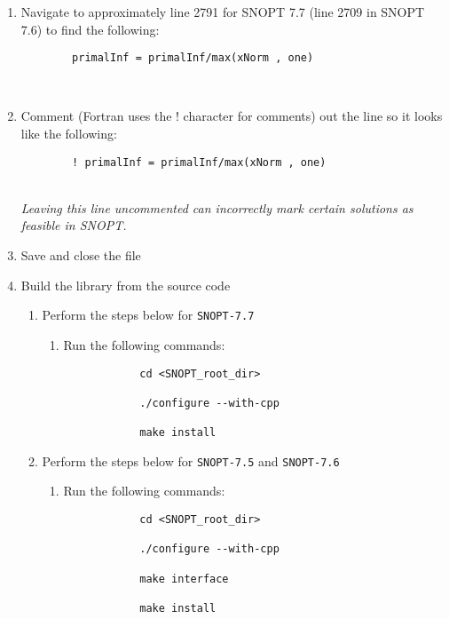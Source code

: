 \begin{enumerate}
	\item Navigate to approximately line 2791 for \ac{SNOPT} 7.7 (line 2709 in \ac{SNOPT} 7.6) to find the following:
		\begin{verbatim}
		primalInf = primalInf/max(xNorm , one)
		\end{verbatim} \\
	\item Comment (Fortran uses the ! character for comments) out the line so it looks like the following:
		\begin{verbatim}
		! primalInf = primalInf/max(xNorm , one)
		\end{verbatim} \\	
	\emph{Leaving this line uncommented can incorrectly mark certain solutions as feasible in \ac{SNOPT}.}
	\item Save and close the file

	\item Build the library from the source code 
	\begin{enumerate}
		
		\item Perform the steps below for \texttt{SNOPT-7.7}
		\begin{enumerate}
			\item Run the following commands:
			\begin{verbatim}
			cd <SNOPT_root_dir>

			./configure --with-cpp

			make install
			\end{verbatim}
		\end{enumerate}
		
		\item Perform the steps below for \texttt{SNOPT-7.5} and \texttt{SNOPT-7.6}
		\begin{enumerate}
			\item Run the following commands:
			\begin{verbatim}
			cd <SNOPT_root_dir>

			./configure --with-cpp

			make interface

			make install
			\end{verbatim}
		\end{enumerate}
		
	\end{enumerate}

\end{enumerate}